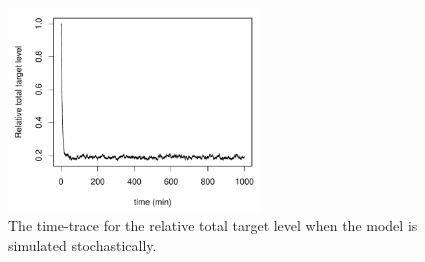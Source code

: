 \documentclass[a4paper,11pt]{article}
\newenvironment{Ncenter}{%
  \setlength\topsep{-10pt}
  \setlength\parskip{-10pt}
  \begin{center}
}{%
  \end{center}
}
\begin{document}
\begin{figure}[!h]
\begin{Ncenter}
\includegraphics[width=0.6\textwidth]{SuppFile1-Trel.pdf}
\end{Ncenter}
\caption{The time-trace for the relative total target level when the model is simulated stochastically.}\label{fig:Trelstoc}
\end{figure}


\end{document}
